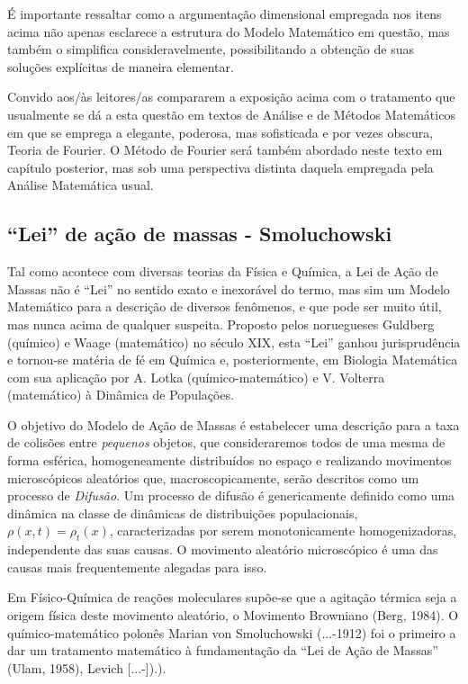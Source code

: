     É importante ressaltar como a argumentação dimensional empregada nos itens acima não apenas esclarece a estrutura do Modelo Matemático em questão, mas também o simplifica consideravelmente, possibilitando a obtenção de suas soluções explícitas de maneira elementar.

    Convido aos/às leitores/as compararem a exposição acima com o tratamento que usualmente se dá a esta questão em textos de Análise e de Métodos Matemáticos em que se emprega a elegante, poderosa, mas sofisticada e por vezes obscura, Teoria de Fourier. O Método de Fourier será também abordado neste texto em capítulo posterior, mas sob uma perspectiva distinta daquela empregada pela Análise Matemática usual.


\subsection{``Lei'' de ação de massas - Smoluchowski}

    Tal como acontece com diversas teorias da Física e Química, a Lei de Ação de Massas não é ``Lei'' no sentido exato e inexorável do termo, mas sim um Modelo Matemático para a descrição de diversos fenômenos, e que pode ser muito útil, mas nunca acima de qualquer suspeita. Proposto pelos noruegueses Guldberg (químico) e Waage (matemático) no século XIX, esta ``Lei'' ganhou jurisprudência e tornou-se matéria de fé em Química e, posteriormente, em Biologia Matemática com sua aplicação por A. Lotka (químico-matemático) e V. Volterra (matemático) à Dinâmica de Populações.

    O objetivo do Modelo de Ação de Massas é estabelecer uma descrição para a taxa de colisões entre \textit{pequenos} objetos, que consideraremos todos de uma mesma de forma esférica, homogeneamente distribuídos no espaço e realizando movimentos microscópicos aleatórios que, macroscopicamente, serão descritos como um processo de \textit{Difusão}. Um processo de difusão é genericamente definido como uma dinâmica na classe de dinâmicas de distribuições populacionais, \(\rho(x, t) = \rho_{t}(x)\), caracterizadas por serem monotonicamente homogenizadoras, independente das suas causas. O movimento aleatório microscópico é uma das causas mais frequentemente alegadas para isso.

    Em Físico-Química de reações moleculares supõe-se que a agitação térmica seja a origem física deste movimento aleatório, o Movimento Browniano (Berg, 1984). O químico-matemático polonês Marian von Smoluchowski (...-1912) foi o primeiro a dar um tratamento matemático à fundamentação da ``Lei de Ação de Massas'' (Ulam, 1958), Levich [...-]).).

